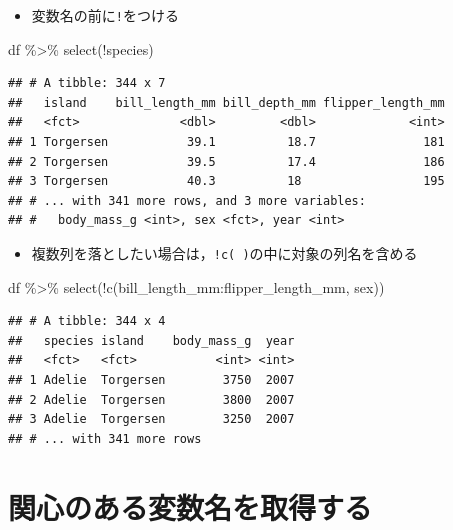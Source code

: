 \documentclass[
  xelatex,ja=standard, b5paper]{bxjsbook}
\newenvironment{Shaded}{\begin{snugshade}}{\end{snugshade}}
\newcommand{\FunctionTok}[1]{\textcolor[rgb]{0.00,0.00,0.00}{#1}}
\newcommand{\NormalTok}[1]{#1}
\newcommand{\SpecialCharTok}[1]{\textcolor[rgb]{0.00,0.00,0.00}{#1}}
\providecommand{\tightlist}{%
  \setlength{\itemsep}{0pt}\setlength{\parskip}{0pt}}
\begin{document}
\begin{itemize}
\tightlist
\item
  変数名の前に\texttt{!}をつける
\end{itemize}

\begin{Shaded}
\begin{Highlighting}[]
\NormalTok{df }\SpecialCharTok{\%\textgreater{}\%} 
  \FunctionTok{select}\NormalTok{(}\SpecialCharTok{!}\NormalTok{species)}
\end{Highlighting}
\end{Shaded}

\begin{verbatim}
## # A tibble: 344 x 7
##   island    bill_length_mm bill_depth_mm flipper_length_mm
##   <fct>              <dbl>         <dbl>             <int>
## 1 Torgersen           39.1          18.7               181
## 2 Torgersen           39.5          17.4               186
## 3 Torgersen           40.3          18                 195
## # ... with 341 more rows, and 3 more variables:
## #   body_mass_g <int>, sex <fct>, year <int>
\end{verbatim}

\begin{itemize}
\tightlist
\item
  複数列を落としたい場合は，\texttt{!c(\ )}の中に対象の列名を含める
\end{itemize}

\begin{Shaded}
\begin{Highlighting}[]
\NormalTok{df }\SpecialCharTok{\%\textgreater{}\%} 
  \FunctionTok{select}\NormalTok{(}\SpecialCharTok{!}\FunctionTok{c}\NormalTok{(bill\_length\_mm}\SpecialCharTok{:}\NormalTok{flipper\_length\_mm, sex))}
\end{Highlighting}
\end{Shaded}

\begin{verbatim}
## # A tibble: 344 x 4
##   species island    body_mass_g  year
##   <fct>   <fct>           <int> <int>
## 1 Adelie  Torgersen        3750  2007
## 2 Adelie  Torgersen        3800  2007
## 3 Adelie  Torgersen        3250  2007
## # ... with 341 more rows
\end{verbatim}

\hypertarget{select-get}{%
\section{関心のある変数名を取得する}\label{select-get}}
\end{document}
